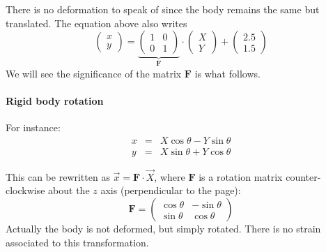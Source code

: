 There is no deformation to speak of since the body remains the same but translated. The equation above also writes
\[
\left(
\begin{array}{c}
x \\ y
\end{array}
\right)
=
\underbrace{
\left(
\begin{array}{cc}
1 & 0 \\
0 & 1
\end{array}
\right)
}_{\bm F}
\cdot
\left(
\begin{array}{c}
X \\ Y
\end{array}
\right)
+
\left(
\begin{array}{c}
2.5 \\ 1.5
\end{array}
\right)
\]
We will see the significance of the matrix ${\bm F}$ is what follows.

\paragraph{Rigid body rotation} For instance:
\begin{eqnarray}
x &=& X \cos \theta - Y \sin \theta \\ 
y &=& X \sin \theta + Y \cos \theta 
\end{eqnarray}


\begin{center}
\end{center}



This can be rewritten as $\vec{x}={\bm F}\cdot \vec{X}$, where 
${\bm F}$ is a rotation matrix counter-clockwise about the $z$ axis (perpendicular
to the page):
\[
{\bm F} = 
\left(
\begin{array}{cc}
\cos\theta & -\sin\theta \\
\sin\theta & \cos\theta 
\end{array}
\right)
\]
Actually the body is not deformed, but simply rotated. There is no strain associated to this 
transformation. 


